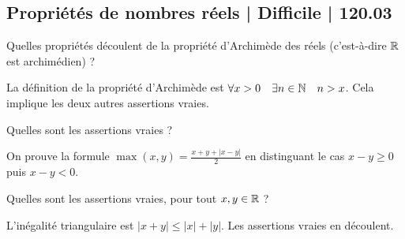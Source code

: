 \subsection{Propriétés de nombres réels | Difficile | 120.03}


\begin{question}

Quelles propriétés découlent de la propriété d’Archimède des réels (c'est-à-dire $\mathbb{R}$ est archimédien) ?
\begin{answers}



\end{answers}
\begin{explanations}
La définition de la propriété d'Archimède est $\forall x>0 \quad \exists n \in\mathbb{N} \quad n>x$. Cela implique les deux autres assertions vraies.
\end{explanations}
\end{question}


\begin{question}

Quelles sont les assertions vraies ?
\begin{answers}



  
\end{answers}
\begin{explanations}
On prouve la formule $\max(x,y) = \frac{x+y + |x-y|}{2}$ en distinguant le cas $x-y \ge0$ puis $x-y<0$.
\end{explanations}
\end{question}


\begin{question}

Quelles sont les assertions vraies, pour tout $x,y\in\mathbb{R}$ ?
\begin{answers}



\end{answers}
\begin{explanations}
L'inégalité triangulaire est $|x+y| \le |x| + |y|$. Les assertions vraies en découlent.
\end{explanations}
\end{question}


